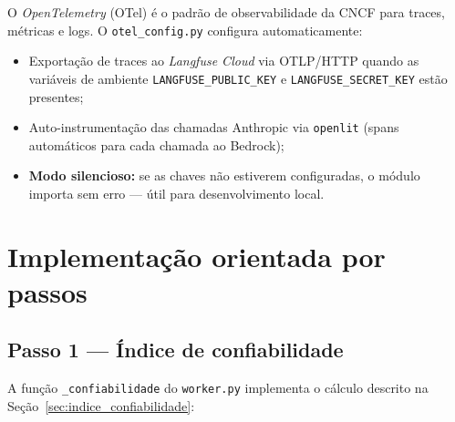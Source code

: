 O \textit{OpenTelemetry} (OTel) \'e o padr\~ao
de observabilidade da CNCF para traces, m\'etricas e logs. O
\texttt{otel\_config.py} configura automaticamente:

\begin{itemize}[leftmargin=*]
  \item Exporta\c{c}\~ao de traces ao \textit{Langfuse Cloud} via
        OTLP/HTTP quando as vari\'aveis de ambiente
        \texttt{LANGFUSE\_PUBLIC\_KEY} e
        \texttt{LANGFUSE\_SECRET\_KEY} est\~ao presentes;
  \item Auto-instrumenta\c{c}\~ao das chamadas Anthropic via
        \texttt{openlit} (spans autom\'aticos para cada chamada ao
        Bedrock);
  \item \textbf{Modo silencioso:} se as chaves n\~ao estiverem
        configuradas, o m\'odulo importa sem erro ---
        \'util para desenvolvimento local.
\end{itemize}

\section{Implementa\c{c}\~ao orientada por passos}

\subsection{Passo 1 --- \'Indice de confiabilidade}

A fun\c{c}\~ao \texttt{\_confiabilidade} do \texttt{worker.py}
implementa o c\'alculo descrito na Se\c{c}\~ao~\ref{sec:indice_confiabilidade}:

